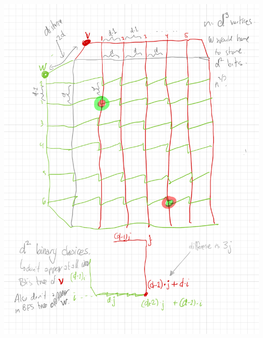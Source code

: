 \documentclass{patmorin}
\begin{document}
\begin{center}
    \includegraphics[width=.8\textwidth]{figs/bad-example}
\end{center}











\end{document}

